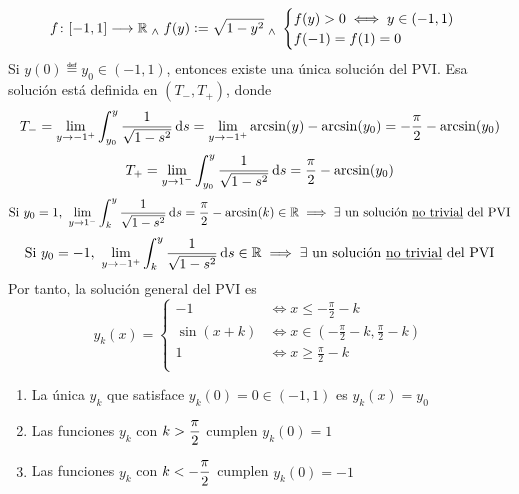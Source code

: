 
\begin{ejem}[$y'=\sqrt{1-y^2}$]
	\[f \colon [-1, 1] \longrightarrow \mathbb{R} \; _{\wedge} \; f(y)\vcentcolon=\sqrt{1-y^2} \; _{\wedge} \; \begin{cases}
			f(y)>0 \iff y\in (-1, 1) \\
			f(-1)=f(1)=0
		\end{cases}\]
	Si $y(0)\eqdef y_0 \in (-1, 1)$, entonces existe una única solución del PVI. Esa solución está definida en $(T_-, T_+)$, donde
	\[T_-=\lim_{y\to -1^+}\int_{y_0}^{y} \frac{1}{\sqrt{1-s^2}}\odif{s}=\lim_{y\to -1^+}\arcsin(y)-\arcsin(y_0)=-\frac{\pi}{2}-\arcsin(y_0)\]
	\[T_+=\lim_{y\to 1^-}\int_{y_0}^{y} \frac{1}{\sqrt{1-s^2}}\odif{s}=\frac{\pi}{2}-\arcsin(y_0)\]
	\[\tex{Si $y_0=1$, }\lim_{y\to 1^-} \int_{k}^{y} \frac{1}{\sqrt{1-s^2}} \odif{s} = \frac{\pi}{2} -\arcsin(k) \in \R \implies \exists \tex{ un solución \underline{no trivial} del PVI}\]
	\[\tex{Si $y_0=-1$, }\lim_{y\to -1^+} \int_{k}^{y} \frac{1}{\sqrt{1-s^2}} \odif{s}  \in \R \implies \exists \tex{ un solución \underline{no trivial} del PVI}\]
	Por tanto, la solución general del PVI es
	\[y_k(x)=\begin{cases}
			-1        & \iff x\leq -\frac{\pi}{2}-k                               \\
			\sin(x+k) & \iff x \in \left(-\frac{\pi}{2}-k, \frac{\pi}{2}-k\right) \\
			1         & \iff x\geq \frac{\pi}{2}-k                                \\
		\end{cases}\]
	\begin{enumerate}
		\item La única $y_k$ que satisface $y_k(0)=0 \in (-1, 1)$ es $y_k(x)=y_0$
		\item Las funciones $y_k$ con $\displaystyle k > \frac{\pi}{2}$ cumplen $y_k(0)=1$
		\item Las funciones $y_k$ con $\displaystyle k < -\frac{\pi}{2}$ cumplen $y_k(0)=-1$
	\end{enumerate}
\end{ejem}

